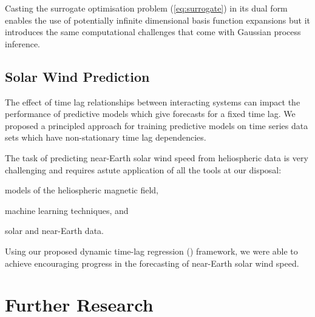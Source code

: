 Casting the surrogate optimisation problem (\cref{eq:surrogate}) in its dual form enables the use 
of potentially infinite dimensional basis function expansions but it introduces the same 
computational challenges that come with Gaussian process inference. 

\subsection*{Solar Wind Prediction}

The effect of time lag relationships between interacting systems can impact the performance of 
predictive models which give forecasts for a fixed time lag. We proposed a principled approach for 
training predictive models on time series data sets which have non-stationary time lag dependencies.

The task of predicting near-Earth solar wind speed from heliospheric data is very challenging and 
requires astute application of all the tools at our disposal: 
\begin{enumerate*} 
    \item models of the heliospheric magnetic field,
    \item machine learning techniques, and 
    \item solar and near-Earth data. 
\end{enumerate*}
Using our proposed dynamic time-lag regression (\XX) framework, we were able to achieve 
encouraging progress in the forecasting of near-Earth solar wind speed.


\section{Further Research}

